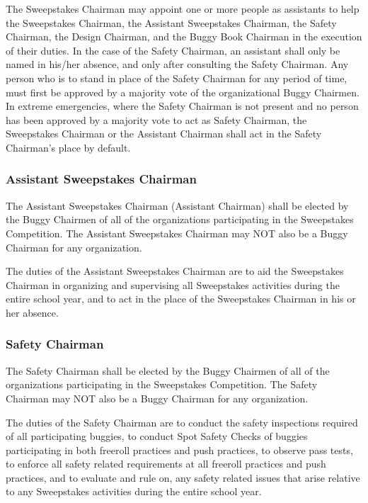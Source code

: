 	The Sweepstakes Chairman may appoint one or more people as assistants to help the Sweepstakes Chairman, the Assistant Sweepstakes Chairman, the Safety Chairman, the Design Chairman, and the Buggy Book Chairman in the execution of their duties. In the case of the Safety Chairman, an assistant shall only be named in his/her absence, and only after consulting the Safety Chairman. Any person who is to stand in place of the Safety Chairman for any period of time, must first be approved by a majority vote of the organizational Buggy Chairmen. In extreme emergencies, where the Safety Chairman is not present and no person has been approved by a majority vote to act as Safety Chairman, the Sweepstakes Chairman or the Assistant Chairman shall act in the Safety Chairman's place by default.

\subsubsection{Assistant Sweepstakes Chairman}

	The Assistant Sweepstakes Chairman (Assistant Chairman) shall be elected by the Buggy Chairmen of all of the organizations participating in the Sweepstakes Competition. The Assistant Sweepstakes Chairman may NOT also be a Buggy Chairman for any organization.

	The duties of the Assistant Sweepstakes Chairman are to aid the Sweepstakes Chairman in organizing and supervising all Sweepstakes activities during the entire school year, and to act in the place of the Sweepstakes Chairman in his or her absence.

\subsubsection{Safety Chairman}

	The Safety Chairman shall be elected by the Buggy Chairmen of all of the organizations participating in the Sweepstakes Competition. The Safety Chairman may NOT also be a Buggy Chairman for any organization.

	The duties of the Safety Chairman are to conduct the safety inspections required of all participating buggies, to conduct Spot Safety Checks of buggies participating in both freeroll practices and push practices, to observe pass tests, to enforce all safety related requirements at all freeroll practices and push practices, and to evaluate and rule on, any safety related issues that arise relative to any Sweepstakes activities during the entire school year.


